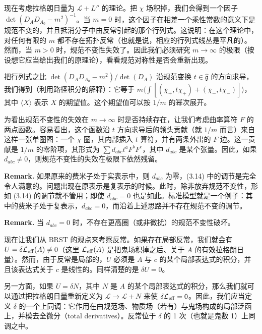 现在考虑拉格朗日量为 $\mathcal L+L''$ 的理论。把 $\chi$ 场积掉，我们会得到一个因子 $\det(D_AD_{A_0}-m^2)^{-1}$。当 $m=0$ 时，这个因子在相差一个乘性常数的意义下是规范不变的，并且抵消分子中由反常引起的那个行列式。这说明：在这个理论中，对任何有限的 $m$ 都不存在拓扑反常（也就是说，相应的行列式线丛是平凡的）。然而，当 $m>0$ 时，规范不变性失效了。因此我们必须研究 $m\to\infty$ 的极限（按设想它应当给出我们的原理论），看看规范对称性是否会重新出现。

把行列式之比 $\det(D_AD_{A_0}-m^2)/\det(D_A)$ 沿规范变换 $t\in\hat{\mathfrak g}$ 的方向求导，我们得到（利用路径积分的解释）：它等于 $m\big\langle\int[(\bar\chi_+,t\chi_+)+(\bar\chi_-,t\chi_-)]\big\rangle$，其中 $\langle X\rangle$ 表示 $X$ 的期望值。这个期望值可以按 $1/m$ 的幂次展开。

为看出规范不变性的失效在 $m\to\infty$ 时是否持续存在，让我们考虑曲率算符 $F$ 的两点函数。容易看出，这个函数沿 $t$ 方向求导后的领头贡献（就 $1/m$ 而言）来自这样一张单圈图：一个 $\chi$ 圈，其内部插入 $t$ 算符，并有两条外出的 $F$-边。这一贡献是 $1/m$ 的零阶项，其形式为 $\sum d_{abc}t^aF^bF^c$，其中 $d_{abc}$ 是某个张量。因此，如果 $d_{abc}\neq0$，则规范不变性的失效在极限下依然残留。


\textbf{Remark.} 如果原来的费米子处于实表示中，则 $d_{abc}$ 为零，(3.14) 中的调节是完全令人满意的。问题出现在原表示是复表示的时候。此时，除非放弃规范不变性，形如 (3.14) 的调节就不管用；即使 $d_{abc}=0$ 也是如此。标准模型就是一个例子：其中的费米子处于复表示，$d_{abc}=0$，而沿着上述思路并不存在规范不变的调节。

\textbf{Remark.} 当 $d_{abc}=0$ 时，不存在更高圈（或非微扰）的规范不变性破坏。

现在让我们从 BRST 的观点来考察反常。如果存在局部反常，我们就会有 $U=\delta\mathcal L_{\rm eff}(A)\neq0$（这里 $\mathcal L_{\rm eff}(A)$ 是把鬼场积掉之后、关于 $A$ 的有效拉格朗日量）。然而，由于反常是局部的，$U$ 必须是 $A$ 与 $c$ 的某个局部表达式的积分，并且该表达式关于 $c$ 是线性的。同样清楚的是 $\delta U=0$。

另一方面，如果 $U=\delta N$，其中 $N$ 是 $A$ 的某个局部表达式的积分，那么我们就可以通过把拉格朗日量重新定义为 $\mathcal L\to\mathcal L+N$ 来使 $\delta\mathcal L_{\rm eff}=0$。因此，我们应当定义 $\delta$ 的一个上同调：它作用在由规范场、物质场（若有）与鬼场构成的局部泛函上，并模去全微分（total derivatives）。反常位于 $\delta$ 的 1 次（也就是鬼数 1）上同调之中。

